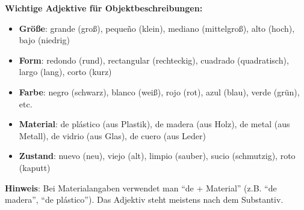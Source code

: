 \documentclass[12pt,a4paper]{article}
\begin{document}
\textbf{Wichtige Adjektive für Objektbeschreibungen:}
\begin{itemize}[leftmargin=*]
    \item \textbf{Größe}: grande (groß), pequeño (klein), mediano (mittelgroß), alto (hoch), bajo (niedrig)
    \item \textbf{Form}: redondo (rund), rectangular (rechteckig), cuadrado (quadratisch), largo (lang), corto (kurz)
    \item \textbf{Farbe}: negro (schwarz), blanco (weiß), rojo (rot), azul (blau), verde (grün), etc.
    \item \textbf{Material}: de plástico (aus Plastik), de madera (aus Holz), de metal (aus Metall), de vidrio (aus Glas), de cuero (aus Leder)
    \item \textbf{Zustand}: nuevo (neu), viejo (alt), limpio (sauber), sucio (schmutzig), roto (kaputt)
\end{itemize}

\textbf{Hinweis}: Bei Materialangaben verwendet man \enquote{de + Material} (z.B. \enquote{de madera}, \enquote{de plástico}). Das Adjektiv steht meistens nach dem Substantiv.
\end{document}
